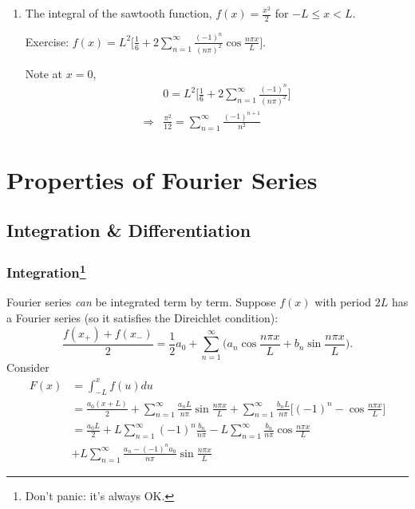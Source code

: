 \documentclass[a4paper]{article}
\begin{document}
\begin{eg}
\begin{enumerate}
\item The integral of the sawtooth function, $f(x) = \frac{x^2}{2}$ for $-L \leq x < L$.
    \begin{center}
    \end{center}
  Exercise: $f(x) = L^2 \big[ \frac{1}{6} + 2\sum_{n=1}^\infty \frac{(-1)^n}{(n\pi)^2} \cos\frac{n\pi x}{L} \big]$.

  Note at $x=0$,
  \begin{align*}
    & 0 = L^2 \Big[\frac{1}{6} + 2\sum_{n=1}^\infty \frac{(-1)^n}{(n\pi)^2} \Big] \\
    \Rightarrow & \frac{\pi^2}{12} = \sum_{n=1}^\infty\frac{(-1)^{n+1}}{n^2}
  \end{align*}
  \end{enumerate}
\end{eg}

\section{Properties of Fourier Series}

\subsection{Integration \& Differentiation}

\subsubsection{Integration\protect\footnote{Don't panic: it's always OK.}}

Fourier series \emph{can} be integrated term by term. Suppose $f(x)$ with period $2L$ has a Fourier series (so it satisfies the Direichlet condition):
\[
  \frac{f(x_+)+f(x_-)}{2} = \frac{1}{2}a_0 + \sum_{n=1}^\infty \Big(a_n\cos\frac{n\pi x}{L} +b_n\sin\frac{n\pi x}{L}\Big).
\]
Consider
\begin{align*}
  F(x) & = \int_{-L}^x f(u) du \\
       &= \frac{a_0(x+L)}{2} + \sum_{n=1}^\infty \frac{a_n L}{n\pi}\sin\frac{n\pi x}{L} + \sum_{n=1}^\infty \frac{b_n L}{n\pi} \Big[(-1)^n - \cos\frac{n\pi x}{L} \Big] \\
       &= \frac{a_0 L}{2} + L \sum_{n=1}^\infty (-1)^n \frac{b_n}{n\pi} - L \sum_{n=1}^\infty \frac{b_n}{n\pi} \cos\frac{n\pi x}{L} \\
       &+ L \sum_{n=1}^\infty \frac{a_n-(-1)^n a_0}{n\pi}\sin\frac{n\pi x}{L}
\end{align*}
\end{document}
